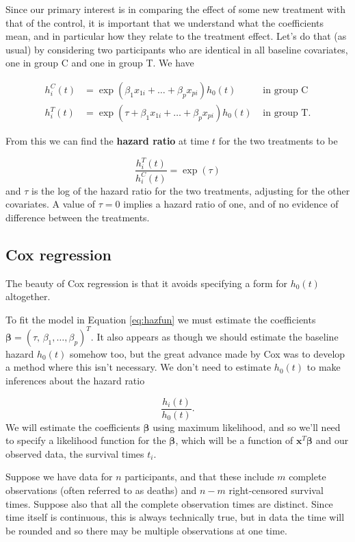 \documentclass[
  openany]{book}
\theoremstyle{definition}
\theoremstyle{definition}
\theoremstyle{definition}
\theoremstyle{definition}
\theoremstyle{remark}
\begin{document}
Since our primary interest is in comparing the effect of some new treatment with that of the control, it is important that we understand what the coefficients mean, and in particular how they relate to the treatment effect.
Let's do that (as usual) by considering two participants who are identical in all baseline covariates, one in group C and one in group T. We have

\begin{align*}
h^C_i\left(t\right) & = \exp\left(\beta_1x_{1i} + \ldots + \beta_p x_{pi}\right)h_0\left(t\right) & \text{ in group C}\\
h^T_i\left(t\right) & = \exp\left(\tau + \beta_1x_{1i} + \ldots + \beta_p x_{pi}\right)h_0\left(t\right) & \text{ in group T.}
\end{align*}

From this we can find the \textbf{hazard ratio} at time \(t\) for the two treatments to be

\[\frac{h^T_i\left(t\right)}{h^C_i\left(t\right)} = \exp{\left(\tau\right)} \]
and \(\tau\) is the log of the hazard ratio for the two treatments, adjusting for the other covariates. A value of \(\tau=0\) implies a hazard ratio of one, and of no evidence of difference between the treatments.

\subsection{Cox regression}\label{coxreg}

The beauty of Cox regression is that it avoids specifying a form for \(h_0\left(t\right)\) altogether.

To fit the model in Equation \eqref{eq:hazfun} we must estimate the coefficients \(\boldsymbol\beta = \left(\tau,\,\beta_1,\ldots,\beta_p\right)^T\). It also appears as though we should estimate the baseline hazard \(h_0\left(t\right)\) somehow too, but the great advance made by Cox was to develop a method where this isn't necessary. We don't need to estimate \(h_0\left(t\right)\) to make inferences about the hazard ratio

\[\frac{h_i\left(t\right)}{h_0\left(t\right)}.\]
We will estimate the coefficients \(\boldsymbol\beta\) using maximum likelihood, and so we'll need to specify a likelihood function for the \(\boldsymbol\beta\), which will be a function of \(\mathbf{x}^T\boldsymbol\beta\) and our observed data, the survival times \(t_i\).

Suppose we have data for \(n\) participants, and that these include \(m\) complete observations (often referred to as deaths) and \(n-m\) right-censored survival times. Suppose also that all the complete observation times are distinct. Since time itself is continuous, this is always technically true, but in data the time will be rounded and so there may be multiple observations at one time.
\end{document}
